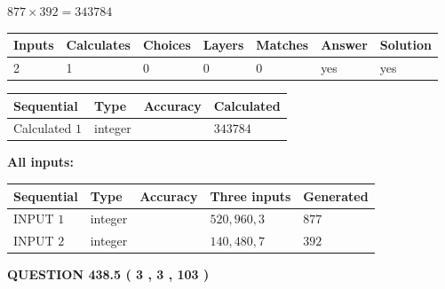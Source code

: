 \documentclass{ctexart}
\begin{document}
 

$ %
877 \times  %
392=   %
343784$
 
 
\noindent{}
 
 

 
   
   
   
   
\noindent\begin{tabular}{|l|l|l|l|l|l|l|}
 \hline
Inputs & Calculates & Choices & Layers & Matches & Answer & Solution \\ \hline
 2  & 
 1  & 
 0
  & 
 0  & 
 0  & 
  yes & 
  yes 
  \\ \hline
 \end{tabular}
   
   
   
   
\noindent{}
   
   
  
  
\noindent\begin{tabular}{|l|l|l|l|}
\hline
 Sequential & Type & Accuracy & Calculated \\ 
\hline
 
 
  Calculated $  1 $ & integer &  & 
  $ 343784 $ 
 \\  \hline  
 \end{tabular}
   
   
   
   
\noindent\vspace{0.1in}\hspace{-0.08in} {\textbf{\Large{All inputs: }}}
   
   
  
  
\noindent\begin{tabular}{|l|l|l|l|l|}
\hline
 Sequential & Type & Accuracy & Three inputs & Generated \\ 
\hline
 
 
  INPUT $  1 $ & integer &  & $
 520
 , 
 960
 , 
 3
 $ & $ 877 $ 
 \\  \hline  
 
 
  INPUT $  2 $ & integer &  & $
 140
 , 
 480
 , 
 7
 $ & $ 392 $ 
 \\  \hline  
 \end{tabular}
   
   
  
\vspace{0.2in}
  
{\textbf{\Large{QUESTION
438.5 
 ( 3 , 3 , 103 )
}}}
  
\end{document}
